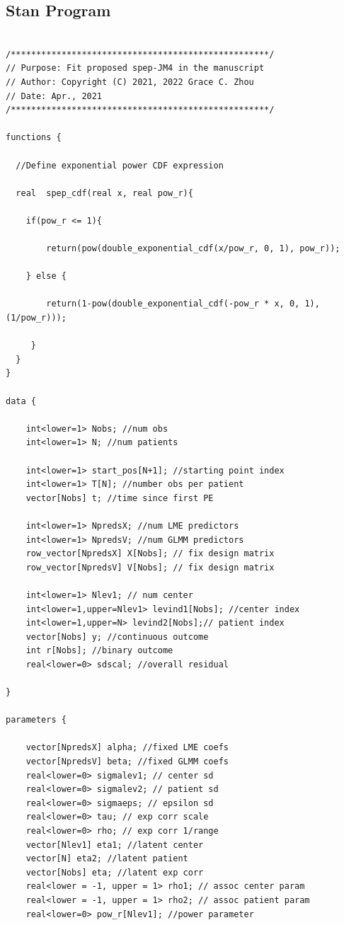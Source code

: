 \begin{SingleSpace}

\subsection{Stan Program}

\begin{verbatim}

/***************************************************/
// Purpose: Fit proposed spep-JM4 in the manuscript  
// Author: Copyright (C) 2021, 2022 Grace C. Zhou
// Date: Apr., 2021
/***************************************************/

functions {

  //Define exponential power CDF expression
  
  real  spep_cdf(real x, real pow_r){
  
    if(pow_r <= 1){
		
		return(pow(double_exponential_cdf(x/pow_r, 0, 1), pow_r)); 
		
	} else { 
	
		return(1-pow(double_exponential_cdf(-pow_r * x, 0, 1), (1/pow_r))); 
		
	 }	
  }
}

data {
  
    int<lower=1> Nobs; //num obs 
    int<lower=1> N; //num patients
    
    int<lower=1> start_pos[N+1]; //starting point index
    int<lower=1> T[N]; //number obs per patient
    vector[Nobs] t; //time since first PE
    
    int<lower=1> NpredsX; //num LME predictors
    int<lower=1> NpredsV; //num GLMM predictors
    row_vector[NpredsX] X[Nobs]; // fix design matrix
    row_vector[NpredsV] V[Nobs]; // fix design matrix 
    
    int<lower=1> Nlev1; // num center
    int<lower=1,upper=Nlev1> levind1[Nobs]; //center index
    int<lower=1,upper=N> levind2[Nobs];// patient index
    vector[Nobs] y; //continuous outcome
    int r[Nobs]; //binary outcome
    real<lower=0> sdscal; //overall residual
   
}

parameters {
	
    vector[NpredsX] alpha; //fixed LME coefs 
    vector[NpredsV] beta; //fixed GLMM coefs 
    real<lower=0> sigmalev1; // center sd 
    real<lower=0> sigmalev2; // patient sd 
    real<lower=0> sigmaeps; // epsilon sd 
    real<lower=0> tau; // exp corr scale
    real<lower=0> rho; // exp corr 1/range 
    vector[Nlev1] eta1; //latent center
    vector[N] eta2; //latent patient
    vector[Nobs] eta; //latent exp corr
    real<lower = -1, upper = 1> rho1; // assoc center param
    real<lower = -1, upper = 1> rho2; // assoc patient param
    real<lower=0> pow_r[Nlev1]; //power parameter 
	

\end{verbatim}
\end{SingleSpace}
